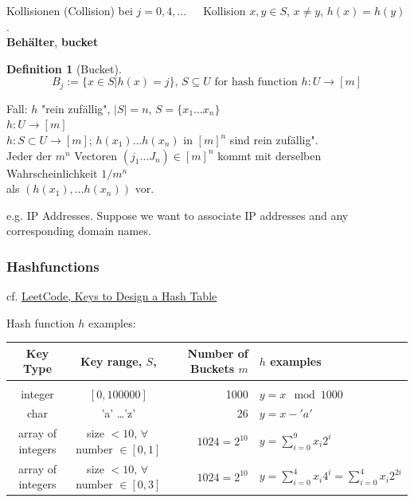 \documentclass[10pt]{amsart}
\newtheorem{definition}{Definition}
\begin{document}
Kollisionen (Collision) bei $j= 0,4, \dots  \quad \,$ Kollision $x, y \in S$, $x\neq y$, $h(x) = h(y)$.  \\

\textbf{Beh\"{a}lter}, \textbf{bucket}
\begin{definition}[Bucket]
	\begin{equation}
	B_j := \lbrace x \in S | h(x) = j \rbrace, \, S\subseteq U \text{ for hash function } h : U\to [m] 
	\end{equation}
\end{definition}

Fall: $h$ "rein zuf\"{a}llig", $|S| = n$, $S= \lbrace x_1 \dots x_n \rbrace$ \\
$h : U \to [m]$ \\
$h: S \subset U \to [m]$; $h(x_1) \dots h(x_n)$ in $[m]^n$ sind rein zuf\"{a}llig".  \\

Jeder der $m^n$ Vectoren $(j_1 \dots J_n) \in [m]^n$ kommt mit derselben Wahrscheinlichkeit $1/m^n$ \\
als $(h(x_1), \dots h(x_n))$ vor.

e.g. IP Addresses. Suppose we want to associate IP addresses and any corresponding domain names.

\subsubsection{Hashfunctions}

cf. \href{https://leetcode.com/explore/learn/card/hash-table/182/practical-applications/1110/}{LeetCode, Keys to Design a Hash Table}

Hash function $h$ examples:

\begin{center}
	\begin{tabular}{ c  c  r  l }
		Key Type & Key range, $S$, & Number of Buckets $m$ & $h$ examples \\ \hline \\
		integer & $[0, 100000]$ & 1000 & $y = x \mod{1000} $ \\
		char & 'a' \dots 'z' & 26 & $ y = x - 'a'$ \\ 
		array of integers & size $< 10, \, \forall \,$ number $\in [0,1]$ & $1024=2^{10}$ & $ y = \sum_{i=0}^9 x_i 2^i$ \\
		array of integers & size $< 10, \, \forall \, $ number $\in [0,3 ]$ & $1024 = 2^{10}$ & $y = \sum_{i=0}^4 x_i 4^i = \sum_{i=0}^4 x_i 2^{2i}$ 
	\end{tabular}
\end{center}
\end{document}
